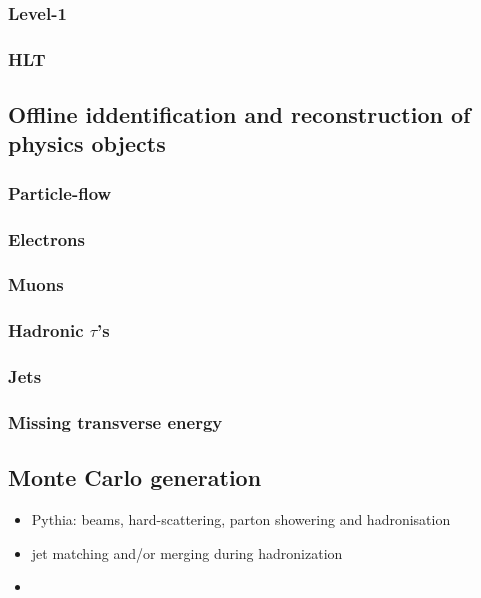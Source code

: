 \documentclass[11pt]{article}
\begin{document}
\subsubsection{Level-1}
\label{sec:org553f35b}
\subsubsection{HLT}
\label{sec:org8d31efb}

\subsection{Offline iddentification and reconstruction of physics objects}
\label{sec:org134a1e7}
\subsubsection{Particle-flow}
\label{sec:orgb4814ef}
\subsubsection{Electrons}
\label{sec:org253d2a1}
\subsubsection{Muons}
\label{sec:orgeb229fd}
\subsubsection{Hadronic \(\tau\)'s}
\label{sec:orgb507fa7}
\subsubsection{Jets}
\label{sec:org2cc8f44}
\subsubsection{Missing transverse energy}
\label{sec:org3f59fbf}
\subsection{Monte Carlo generation}
\label{sec:org6bd1609}
\begin{itemize}
\item Pythia: beams, hard-scattering, parton showering and hadronisation
\item jet matching and/or merging during hadronization
\item 
\end{itemize}
\end{document}
